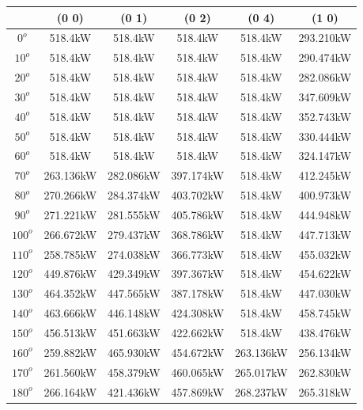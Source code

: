         \singlespacing
        \begin{table}[H]
        	\centering
        	\begin{tabular}{|c|c|c|c|c|c|} \hline
        			& (0 0)		& (0 1)		& (0 2)		& (0 4)		& (1 0)		\\ \hline
        		$0^o$	& 518.4kW	& 518.4kW	& 518.4kW	& 518.4kW	& 293.210kW	\\ \hline
        		$10^o$	& 518.4kW	& 518.4kW	& 518.4kW	& 518.4kW	& 290.474kW	\\ \hline
        		$20^o$	& 518.4kW	& 518.4kW	& 518.4kW	& 518.4kW	& 282.086kW	\\ \hline
        		$30^o$	& 518.4kW	& 518.4kW	& 518.4kW	& 518.4kW	& 347.609kW	\\ \hline
        		$40^o$	& 518.4kW	& 518.4kW	& 518.4kW	& 518.4kW	& 352.743kW	\\ \hline
        		$50^o$	& 518.4kW	& 518.4kW	& 518.4kW	& 518.4kW	& 330.444kW	\\ \hline
        		$60^o$	& 518.4kW	& 518.4kW	& 518.4kW	& 518.4kW	& 324.147kW	\\ \hline
        		$70^o$	& 263.136kW	& 282.086kW	& 397.174kW	& 518.4kW	& 412.245kW	\\ \hline
        		$80^o$	& 270.266kW	& 284.374kW	& 403.702kW	& 518.4kW	& 400.973kW	\\ \hline
        		$90^o$	& 271.221kW	& 281.555kW	& 405.786kW	& 518.4kW	& 444.948kW	\\ \hline
        		$100^o$	& 266.672kW	& 279.437kW	& 368.786kW	& 518.4kW	& 447.713kW	\\ \hline
        		$110^o$	& 258.785kW	& 274.038kW	& 366.773kW	& 518.4kW	& 455.032kW	\\ \hline
        		$120^o$	& 449.876kW	& 429.349kW	& 397.367kW	& 518.4kW	& 454.622kW	\\ \hline
        		$130^o$	& 464.352kW	& 447.565kW	& 387.178kW	& 518.4kW	& 447.030kW	\\ \hline
        		$140^o$	& 463.666kW	& 446.148kW	& 424.308kW	& 518.4kW	& 458.745kW	\\ \hline
        		$150^o$	& 456.513kW	& 451.663kW	& 422.662kW	& 518.4kW	& 438.476kW	\\ \hline
        		$160^o$	& 259.882kW	& 465.930kW	& 454.672kW	& 263.136kW	& 256.134kW	\\ \hline
        		$170^o$	& 261.560kW	& 458.379kW	& 460.065kW	& 265.017kW	& 262.830kW	\\ \hline
        		$180^o$	& 266.164kW	& 421.436kW	& 457.869kW	& 268.237kW	& 265.318kW	\\ \hline

\end{tabular}
\end{table}
